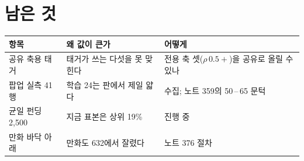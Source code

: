 \documentclass[11pt]{article}
\begin{document}
\section{남은 것}

\begin{center}
\begin{tabular}{lll}
\hline
항목 & 왜 값이 큰가 & 어떻게 \\
\hline
공유 축용 태거 & 태거가 쓰는 다섯을 못 맞힌다 & 전용 축 셋($\rho\,0.5{+}$)을 공유로 올릴 수 있나 \\
팝업 실측 41행 & 학습 24는 판에서 제일 얇다 & 수집; 노트 359의 50\,--\,65 문턱 \\
균일 펀딩 2,500 & 지금 표본은 상위 19\% & 진행 중 \\
만화 바닥 아래 & 만화도 632에서 잘렸다 & 노트 376 절차 \\
\hline
\end{tabular}
\end{center}
\end{document}
